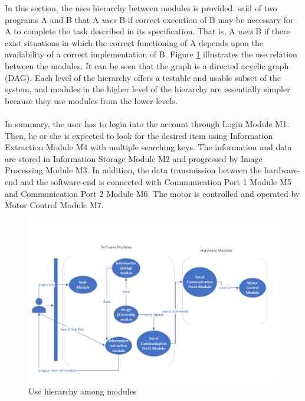 \documentclass[12pt, titlepage]{article}
\begin{document}
In this section, the uses hierarchy between modules is
provided. \citet{Parnas1978} said of two programs A and B that A {\em uses} B if
correct execution of B may be necessary for A to complete the task described in
its specification. That is, A {\em uses} B if there exist situations in which
the correct functioning of A depends upon the availability of a correct
implementation of B.  Figure \ref{FigUH} illustrates the use relation between
the modules. It can be seen that the graph is a directed acyclic graph
(DAG). Each level of the hierarchy offers a testable and usable subset of the
system, and modules in the higher level of the hierarchy are essentially simpler
because they use modules from the lower levels.\\
\\
In summary, the user has to login into the account through Login Module M1. Then, he or she is expected to look for the desired item using Information Extraction Module M4 with multiple searching keys. The information and data are stored in Information Storage Module M2 and progressed by Image Processing Module M3. In addition, the data transmission between the hardware-end and the software-end is connected with Communication Port 1 Module M5 and Communication Port 2 Module M6. The motor is controlled and operated by Motor Control Module M7.


\begin{figure}[H]
\centering
\includegraphics[width=1\textwidth]{UsesHierarchy.png}
\caption{Use hierarchy among modules}
\label{FigUH}
\end{figure}
\end{document}
